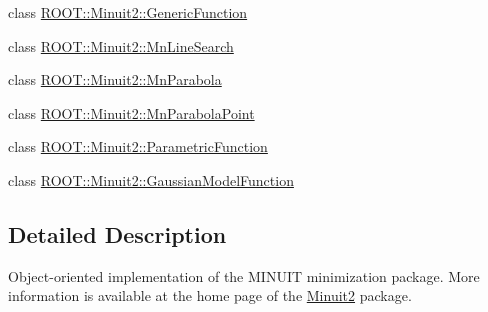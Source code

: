 \begin{DoxyCompactItemize}
\item 
class \mbox{\hyperlink{classROOT_1_1Minuit2_1_1GenericFunction}{R\+O\+O\+T\+::\+Minuit2\+::\+Generic\+Function}}
\item 
class \mbox{\hyperlink{classROOT_1_1Minuit2_1_1MnLineSearch}{R\+O\+O\+T\+::\+Minuit2\+::\+Mn\+Line\+Search}}
\item 
class \mbox{\hyperlink{classROOT_1_1Minuit2_1_1MnParabola}{R\+O\+O\+T\+::\+Minuit2\+::\+Mn\+Parabola}}
\item 
class \mbox{\hyperlink{classROOT_1_1Minuit2_1_1MnParabolaPoint}{R\+O\+O\+T\+::\+Minuit2\+::\+Mn\+Parabola\+Point}}
\item 
class \mbox{\hyperlink{classROOT_1_1Minuit2_1_1ParametricFunction}{R\+O\+O\+T\+::\+Minuit2\+::\+Parametric\+Function}}
\item 
class \mbox{\hyperlink{classROOT_1_1Minuit2_1_1GaussianModelFunction}{R\+O\+O\+T\+::\+Minuit2\+::\+Gaussian\+Model\+Function}}
\end{DoxyCompactItemize}


\subsection{Detailed Description}
Object-\/oriented implementation of the M\+I\+N\+U\+IT minimization package. More information is available at the home page of the \mbox{\hyperlink{namespaceROOT_1_1Minuit2}{Minuit2}} package. 